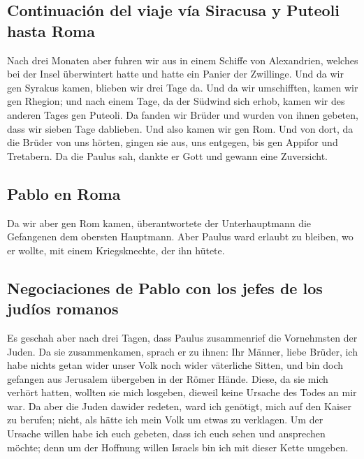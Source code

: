 \hypertarget{continuaciuxf3n-del-viaje-vuxeda-siracusa-y-puteoli-hasta-roma}{%
\subsection{Continuación del viaje vía Siracusa y Puteoli hasta
Roma}\label{continuaciuxf3n-del-viaje-vuxeda-siracusa-y-puteoli-hasta-roma}}

 Nach drei Monaten aber fuhren wir aus in einem Schiffe
von Alexandrien, welches bei der Insel überwintert hatte und hatte ein
Panier der Zwillinge.  Und da wir gen Syrakus kamen,
blieben wir drei Tage da.  Und da wir umschifften, kamen
wir gen Rhegion; und nach einem Tage, da der Südwind sich erhob, kamen
wir des anderen Tages gen Puteoli.  Da fanden wir Brüder
und wurden von ihnen gebeten, dass wir sieben Tage dablieben. Und also
kamen wir gen Rom.  Und von dort, da die Brüder von uns
hörten, gingen sie aus, uns entgegen, bis gen Appifor und Tretabern. Da
die Paulus sah, dankte er Gott und gewann eine Zuversicht.

\hypertarget{pablo-en-roma}{%
\subsection{Pablo en Roma}\label{pablo-en-roma}}

 Da wir aber gen Rom kamen, überantwortete der
Unterhauptmann die Gefangenen dem obersten Hauptmann. Aber Paulus ward
erlaubt zu bleiben, wo er wollte, mit einem Kriegsknechte, der ihn
hütete.

\hypertarget{negociaciones-de-pablo-con-los-jefes-de-los-juduxedos-romanos}{%
\subsection{Negociaciones de Pablo con los jefes de los judíos
romanos}\label{negociaciones-de-pablo-con-los-jefes-de-los-juduxedos-romanos}}

 Es geschah aber nach drei Tagen, dass Paulus
zusammenrief die Vornehmsten der Juden. Da sie zusammenkamen, sprach er
zu ihnen: Ihr Männer, liebe Brüder, ich habe nichts getan wider unser
Volk noch wider väterliche Sitten, und bin doch gefangen aus Jerusalem
übergeben in der Römer Hände.  Diese, da sie mich verhört
hatten, wollten sie mich losgeben, dieweil keine Ursache des Todes an
mir war.  Da aber die Juden dawider redeten, ward ich
genötigt, mich auf den Kaiser zu berufen; nicht, als hätte ich mein Volk
um etwas zu verklagen.  Um der Ursache willen habe ich
euch gebeten, dass ich euch sehen und ansprechen möchte; denn um der
Hoffnung willen Israels bin ich mit dieser Kette umgeben.

